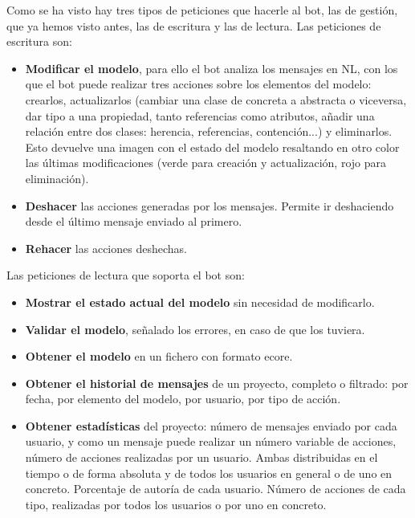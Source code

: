 Como se ha visto hay tres tipos de peticiones que hacerle al bot, las de gestión, que ya hemos visto antes, las de escritura y las de lectura. Las peticiones de escritura son:
\begin{itemize}
\item \textbf{Modificar el modelo}, para ello el bot analiza los mensajes en NL, con los que el bot puede realizar tres acciones sobre los elementos del modelo: crearlos, actualizarlos (cambiar una clase de concreta a abstracta o viceversa, dar tipo a una propiedad, tanto referencias como atributos, añadir una relación entre dos clases: herencia, referencias, contención...) y eliminarlos. Esto devuelve una imagen con el estado del modelo resaltando en otro color las últimas modificaciones (verde para creación y actualización, rojo para eliminación). 
\item \textbf{Deshacer} las acciones generadas por los mensajes. Permite ir deshaciendo desde el último mensaje enviado al primero. 
\item \textbf{Rehacer} las acciones deshechas. 
\end{itemize}
Las peticiones de lectura que soporta el bot son: 
\begin{itemize}
\item \textbf{Mostrar el estado actual del modelo} sin necesidad de modificarlo.
\item \textbf{Validar el modelo}, señalado los errores, en caso de que los tuviera.
\item \textbf{Obtener el modelo} en un fichero con formato ecore. 
\item \textbf{Obtener el historial de mensajes} de un proyecto, completo o filtrado: por fecha, por elemento del modelo, por usuario, por tipo de acción. 
\item \textbf{Obtener estadísticas} del proyecto: número de mensajes enviado por cada usuario, y como un mensaje puede realizar un número variable de acciones, número de acciones realizadas por un usuario. Ambas distribuidas en el tiempo o de forma absoluta y de todos los usuarios en general o de uno en concreto. Porcentaje de autoría de cada usuario. Número de acciones de cada tipo, realizadas por todos los usuarios o por uno en concreto. 
\end{itemize}

